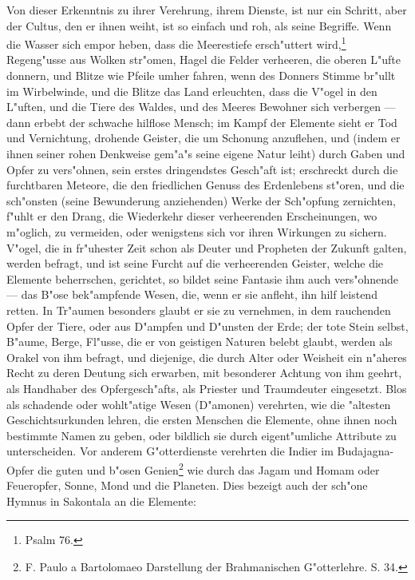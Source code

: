 \documentclass[a4paper, 11pt, oneside, polutonikogreek, german]{article}
\begin{document}
Von dieser Erkenntnis zu ihrer Verehrung, ihrem Dienste, ist nur ein Schritt, aber der Cultus, den er ihnen weiht, ist so einfach und roh, als seine Begriffe. Wenn die Wasser sich empor heben, dass die Meerestiefe ersch"uttert wird,\footnote{Psalm 76.} Regeng"usse aus Wolken str"omen, Hagel die Felder verheeren, die oberen L"ufte donnern, und Blitze wie Pfeile umher fahren, wenn des Donners Stimme br"ullt im Wirbelwinde, und die Blitze das Land erleuchten, dass die V"ogel in den L"uften, und die Tiere des Waldes, und des Meeres Bewohner sich verbergen --- dann erbebt der schwache hilflose Mensch; im Kampf der Elemente sieht er Tod und Vernichtung, drohende Geister, die um Schonung anzuflehen, und (indem er ihnen seiner rohen Denkweise gem"a"s seine eigene Natur leiht) durch Gaben und Opfer zu vers"ohnen, sein erstes dringendstes Gesch"aft ist; erschreckt durch die furchtbaren Meteore, die den friedlichen Genuss des Erdenlebens st"oren, und die sch"onsten (seine Bewunderung anziehenden) Werke der Sch"opfung zernichten, f"uhlt er den Drang, die Wiederkehr dieser verheerenden Erscheinungen, wo m"oglich, zu vermeiden, oder wenigstens sich vor ihren Wirkungen zu sichern. V"ogel, die in fr"uhester Zeit schon als Deuter und Propheten der Zukunft galten, werden befragt, und ist seine Furcht auf die verheerenden Geister, welche die Elemente beherrschen, gerichtet, so bildet seine Fantasie ihm auch vers"ohnende --- das B"ose bek"ampfende Wesen, die, wenn er sie anfleht, ihn hilf leistend retten. In Tr"aumen besonders glaubt er sie zu vernehmen, in dem rauchenden Opfer der Tiere, oder aus D"ampfen und D"unsten der Erde; der tote Stein selbst, B"aume, Berge, Fl"usse, die er von geistigen Naturen belebt glaubt, werden als Orakel von ihm befragt, und diejenige, die durch Alter oder Weisheit ein n"aheres Recht zu deren Deutung sich erwarben, mit besonderer Achtung von ihm geehrt, als Handhaber des Opfergesch"afts, als Priester und Traumdeuter eingesetzt. Blos als schadende oder wohlt"atige Wesen (D"amonen) verehrten, wie die "altesten Geschichtsurkunden lehren, die ersten Menschen die Elemente, ohne ihnen noch bestimmte Namen zu geben, oder bildlich sie durch eigent"umliche Attribute zu unterscheiden. Vor anderem G"otterdienste verehrten die Indier im Budajagna-Opfer die guten und b"osen Genien\footnote{F. Paulo a Bartolomaeo Darstellung der Brahmanischen G"otterlehre. S. 34.} wie durch das Jagam und Homam oder Feueropfer, Sonne, Mond und die Planeten. Dies bezeigt auch der sch"one Hymnus in Sakontala an die Elemente:
\vspace{9pt}
\end{document}
